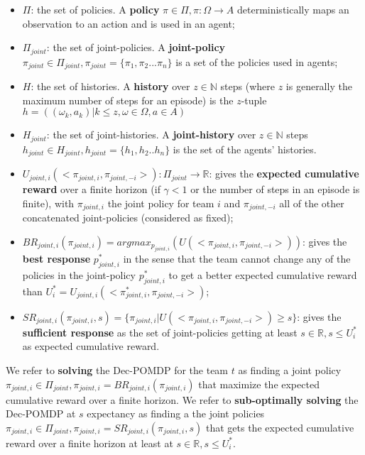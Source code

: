 \documentclass{ecai}
\begin{document}
\begin{itemize}

    \item $\Pi$: the set of policies. A \textbf{policy} $\pi \in \Pi, \pi: \Omega \rightarrow A$ deterministically maps an observation to an action and is used in an agent;
    \item $\Pi_{joint}$: the set of joint-policies. A \textbf{joint-policy} $\pi_{joint} \in \Pi_{joint}, \pi_{joint} = \{\pi_1, \pi_2...\pi_n\}$ is a set of the policies used in agents;
    \item $H$: the set of histories. A \textbf{history} over $z \in \mathbb{N}$ steps (where $z$ is generally the maximum number of steps for an episode) is the $z$-tuple $h = ((\omega_{k}, a_{k}) | k \leq z, \omega \in \Omega, a \in A)$
    \item $H_{joint}$: the set of joint-histories. A \textbf{joint-history} over $z \in \mathbb{N}$ steps $h_{joint} \in H_{joint}, h_{joint} = \{h_1,h_2..h_n\}$ is the set of the agents' histories.
    \item $U_{joint,i}(<\pi_{joint,i}, \pi_{joint,-i}>): \Pi_{joint} \rightarrow \mathbb{R}$: gives the \textbf{expected cumulative reward} over a finite horizon (if $\gamma < 1$ or the number of steps in an episode is finite), with $\pi_{joint,i}$ the joint policy for team $i$ and $\pi_{joint,-i}$ all of the other concatenated joint-policies (considered as fixed);
    \item $BR_{joint,i}(\pi_{joint,i}) = argmax_{p_{joint,i}}(U(<\pi_{joint,i},\pi_{joint,-i}>))$: gives the \textbf{best response} $p_{joint,i}^*$ in the sense that the team cannot change any of the policies in the joint-policy $p_{joint,i}^*$ to get a better expected cumulative reward than $U_i^* = U_{joint,i}(<\pi_{joint,i}^*, \pi_{joint,-i}>)$;
    \item $SR_{joint,i}(\pi_{joint,i}, s) = \{\pi_{joint,i} | U(<\pi_{joint,i},\pi_{joint,-i}>) \geq s\}$: gives the \textbf{sufficient response} as the set of joint-policies getting at least $s \in \mathbb{R}, s \leq U_i^*$ as expected cumulative reward.
\end{itemize}

We refer to \textbf{solving} the Dec-POMDP for the team $t$ as finding a joint policy $\pi_{joint,i} \in \Pi_{joint}, \pi_{joint,i} = BR_{joint,i}(\pi_{joint,i})$ that maximize the expected cumulative reward over a finite horizon.
We refer to \textbf{sub-optimally solving} the Dec-POMDP at $s$ expectancy as finding a the joint policies $\pi_{joint,i} \in \Pi_{joint}, \pi_{joint,i} = SR_{joint,i}(\pi_{joint,i}, s)$ that gets the expected cumulative reward over a finite horizon at least at $s \in \mathbb{R}, s \leq U_i^*$.
\end{document}
